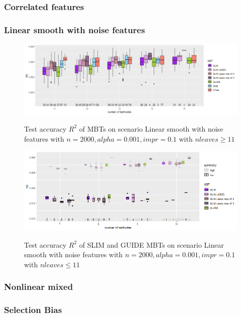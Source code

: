 \begin{table}
\begin{tabular}[t]{l|l|r|r|r|r|r|r|r|r|r}
\end{tabular}
\label{tab:app_linear_mixed_5000}

\end{table}



\subsubsection{Correlated features}

\subsubsection{Linear smooth with noise features}

\begin{figure} 
\caption{Test accuracy $R^2$ of MBTs on scenario Linear smooth with noise features with $n=2000, alpha = 0.001, impr = 0.1$ with $n leaves \geq 11$}
    \includegraphics[width=16cm]{Figures/simulations/batchtools/lasso/lasso_standalone_r2_test.png}
    \label{fig:lasso_standalone_r2_test}
\end{figure} 

\begin{figure}
\caption{Test accuracy $R^2$ of SLIM and GUIDE MBTs on scenario Linear smooth with noise features with $n=2000, alpha = 0.001, impr = 0.1$ with $n leaves \leq 11$}
    \includegraphics[width=16cm]{Figures/simulations/batchtools/lasso/lasso_standalone_r2_test_slim.png}
    \label{fig:lasso_standalone_r2_test_slim}
\end{figure} 

\subsubsection{Nonlinear mixed}


\subsubsection{Selection Bias}